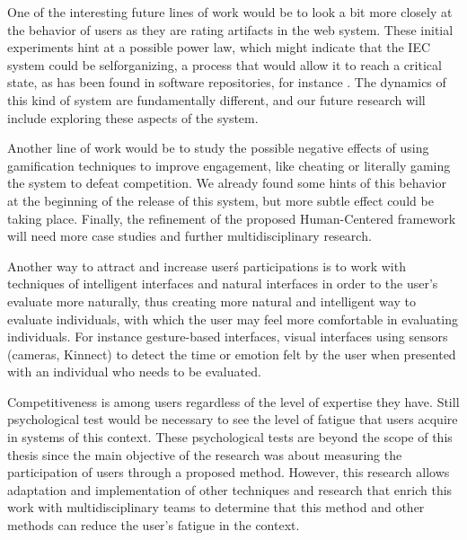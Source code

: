 One of the interesting future lines of work would be to look a bit more closely at the
behavior of users as they are rating artifacts in the web system. These initial
experiments hint at a possible power law, which might indicate that the IEC
system could be selforganizing, a process that would allow it to reach a
critical state, as has been found in software repositories, for instance \cite{merelo2016self}.
The dynamics of this kind of system are fundamentally different, and our future
research will include exploring these aspects of the system.

Another line of work would be to study the possible negative effects of using gamification
techniques to improve engagement, like cheating or literally gaming the system
to defeat competition. We already found some hints of this behavior at the
beginning of the release of this system, but more subtle effect could be taking
place. Finally, the refinement of the proposed Human-Centered framework will
need more case studies and further multidisciplinary research.

Another way to attract and increase user\'s participations is to work with
techniques of intelligent interfaces and natural interfaces in order to the
user's evaluate more naturally, thus creating more natural and intelligent way
to evaluate individuals, with which the user may feel more comfortable in
evaluating individuals. For instance  gesture-based interfaces, visual
interfaces using sensors (cameras, Kinnect) to detect the time or emotion felt
by the user when presented with an individual who needs to be evaluated.

Competitiveness is among users regardless of the level of expertise they have.
Still psychological test would be necessary to see the level of fatigue that
users acquire in systems of this context. These psychological tests are beyond
the scope of this thesis since the main objective of the research was about
measuring the participation of users through a proposed method. However, this
research allows adaptation and implementation of other techniques and research
that enrich this work with multidisciplinary teams to determine that this method
and other methods can reduce the user's fatigue in the context.

